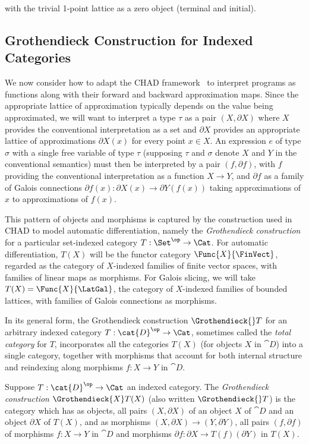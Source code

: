 \noindent with the trivial 1-point lattice as a zero object (terminal and initial).

\subsection{Grothendieck Construction for Indexed Categories}
\label{sec:Grothendieck}

We now consider how to adapt the CHAD framework~\cite{vakar22,nunes2023} to interpret programs as functions
along with their forward and backward approximation maps. Since the appropriate lattice of approximation
typically depends on the value being approximated, we will want to interpret a type $\tau$ as a pair $(X,
\partial X)$ where $X$ provides the conventional interpretation as a set and $\partial X$ provides an
appropriate lattice of approximations $\partial X(x)$ for every point $x \in X$. An expression $e$ of type
$\sigma$ with a single free variable of type $\tau$ (supposing $\tau$ and $\sigma$ denote $X$ and $Y$ in the
conventional semantics) must then be interpreted by a pair $(f, \partial f)$, with $f$ providing the
conventional interpretation as a function $X \to Y$, and $\partial f$ as a family of Galois connections
$\partial f(x): \partial X(x) \to \partial Y(f(x))$ taking approximations of $x$ to approximations of $f(x)$.

This pattern of objects and morphisms is captured by the construction used in CHAD to model automatic
differentiation, namely the \emph{Grothendieck construction} for a particular set-indexed category $T:
\Set^\op \to \Cat$. For automatic differentiation, $T(X)$ will be the functor category $\Func{X}{\FinVect}$,
regarded as the category of $X$-indexed families of finite vector spaces, with families of linear maps as
morphisms. For Galois slicing, we will take $T(X) = \Func{X}{\LatGal}$, the category of $X$-indexed families
of bounded lattices, with families of Galois connections as morphisms.

In its general form, the Grothendieck construction $\Grothendieck{}T$ for an arbitrary indexed category $T:
\cat{D}^\op \to \Cat$, sometimes called the \emph{total category} for $T$, incorporates all the categories
$T(X)$ (for objects $X$ in $\cat{D}$) into a single category, together with morphisms that account for both
internal structure and reindexing along morphisms $f: X \to Y$ in $\cat{D}$.

\begin{definition}
\label{def:Grothendieck}
Suppose $T: \cat{D}^\op \to \Cat$ an indexed category. The \emph{Grothendieck construction}
$\Grothendieck{X}T(X)$ (also written $\Grothendieck{}T$) is the category which has as objects, all pairs $(X,
\partial X)$ of an object $X$ of $\cat{D}$ and an object $\partial X$ of $T(X)$, and as morphisms $(X,
\partial X) \to (Y, \partial Y)$, all pairs $(f, \partial f)$ of morphisms $f: X \to Y$ in $\cat{D}$ and
morphisms $\partial f: \partial X \to T(f)(\partial Y)$ in $T(X)$.
\end{definition}

